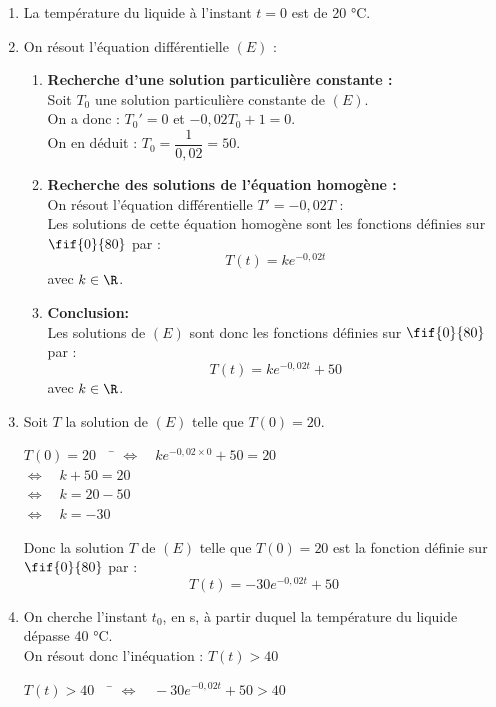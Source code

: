 \documentclass[a4paper,11pt,exos]{nsi}
\begin{document}
\textcolor{UGLiBlue}{
    \begin{enumerate}
        \item La température du liquide à l'instant $t=0$ est de 20 °C.
        \item On résout l'équation différentielle $(E)$ :
        \begin{enumerate}[label=\textbullet]
            \item \textbf{Recherche d’une solution particulière constante :}\\
            Soit $T_0$ une solution particulière constante de $(E)$.\\
            On a donc : $T_0' = 0$ et $-0{,}02T_0 + 1 = 0$.\\
            On en déduit : $T_0 = \dfrac{1}{0{,}02} = 50$.
            \item \textbf{Recherche des solutions de l'équation homogène :}\\
            On résout l'équation différentielle $T'=-0{,}02T$ :\\
            Les solutions de cette équation homogène sont les fonctions définies sur $\fif{0}{80}$ par :
            $$T(t) = ke^{-0{,}02t}$$
            avec $k \in \R$.
            \item \textbf{Conclusion:}\\
            Les solutions de $(E)$ sont donc les fonctions définies sur $\fif{0}{80}$ par :
            $$T(t) = ke^{-0{,}02t} + 50$$
            avec $k \in \R$.
        \end{enumerate}
        \item Soit $T$ la solution de $(E)$ telle que $T(0)=20$.
        \begin{tabbing}
            $T(0)=20 \quad$ \= $\iff\quad ke^{-0{,}02\times 0} + 50 = 20$\\
            \> $\iff\quad k + 50 = 20$\\
            \> $\iff\quad k = 20 - 50$\\
            \> $\iff\quad k = -30$
        \end{tabbing}
        Donc la solution $T$ de $(E)$ telle que $T(0)=20$ est la fonction définie sur $\fif{0}{80}$ par :
        $$T(t) = -30e^{-0{,}02t} + 50$$
        \item On cherche l'instant $t_0$, en s, à partir duquel la température du liquide dépasse 40 °C.\\
        On résout donc l'inéquation : $T(t) > 40$
        \begin{tabbing}
            $T(t) > 40 \quad$ \= $\iff\quad -30e^{-0{,}02t} + 50 > 40$\\

\end{tabbing}
\end{enumerate}}
\end{document}

